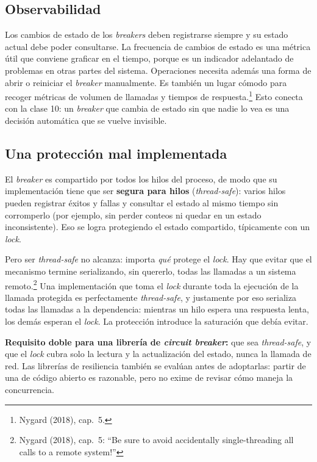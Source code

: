 \documentclass[variant=apuntes,cover=institutional,mode=screen]{ua-engineering-v6-article}
\begin{document}
\subsection{Observabilidad}

Los cambios de estado de los \emph{breakers} deben registrarse siempre y su estado actual debe poder consultarse. La frecuencia de cambios de estado es una métrica útil que conviene graficar en el tiempo, porque es un indicador adelantado de problemas en otras partes del sistema. Operaciones necesita además una forma de abrir o reiniciar el \emph{breaker} manualmente. Es también un lugar cómodo para recoger métricas de volumen de llamadas y tiempos de respuesta.\footnote{Nygard (2018), cap.~5.} Esto conecta con la clase 10: un \emph{breaker} que cambia de estado sin que nadie lo vea es una decisión automática que se vuelve invisible.

\subsection{Una protección mal implementada}

El \emph{breaker} es compartido por todos los hilos del proceso, de modo que su implementación tiene que ser \textbf{segura para hilos} (\emph{thread-safe}): varios hilos pueden registrar éxitos y fallas y consultar el estado al mismo tiempo sin corromperlo (por ejemplo, sin perder conteos ni quedar en un estado inconsistente). Eso se logra protegiendo el estado compartido, típicamente con un \emph{lock}.

Pero ser \emph{thread-safe} no alcanza: importa \emph{qué} protege el \emph{lock}. Hay que evitar que el mecanismo termine serializando, sin quererlo, todas las llamadas a un sistema remoto.\footnote{Nygard (2018), cap.~5: ``Be sure to avoid accidentally single-threading all calls to a remote system!''} Una implementación que toma el \emph{lock} durante toda la ejecución de la llamada protegida es perfectamente \emph{thread-safe}, y justamente por eso serializa todas las llamadas a la dependencia: mientras un hilo espera una respuesta lenta, los demás esperan el \emph{lock}. La protección introduce la saturación que debía evitar.

\begin{uawarn}
\textbf{Requisito doble para una librería de \emph{circuit breaker}:} que sea \emph{thread-safe}, y que el \emph{lock} cubra solo la lectura y la actualización del estado, nunca la llamada de red. Las librerías de resiliencia también se evalúan antes de adoptarlas: partir de una de código abierto es razonable, pero no exime de revisar cómo maneja la concurrencia.
\end{uawarn}
\end{document}
